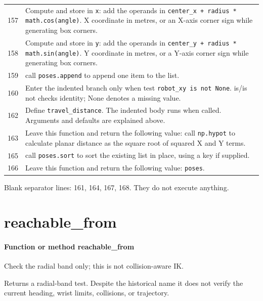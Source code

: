 \documentclass[11pt,a4paper]{book}
\begin{document}
\begin{longtable}{r p{}}
157 & Compute and store in \texttt{x}: add the operands in \texttt{center\_x + radius * math.cos(angle)}. X coordinate in metres, or an X-axis corner sign while generating box corners. \\

158 & Compute and store in \texttt{y}: add the operands in \texttt{center\_y + radius * math.sin(angle)}. Y coordinate in metres, or a Y-axis corner sign while generating box corners. \\

159 & call \texttt{poses.append} to append one item to the list. \\

160 & Enter the indented branch only when test \texttt{robot\_xy is not None}. is/is not checks identity; None denotes a missing value. \\

162 & Define \texttt{travel\_distance}. The indented body runs when called. Arguments and defaults are explained above. \\

163 & Leave this function and return the following value: call \texttt{np.hypot} to calculate planar distance as the square root of squared X and Y terms. \\

165 & call \texttt{poses.sort} to sort the existing list in place, using a key if supplied. \\

166 & Leave this function and return the following value: \texttt{poses}. \\

\end{longtable}

Blank separator lines: 161, 164, 167, 168. They do not execute anything.

\section{reachable\_from}

\paragraph{Function or method reachable\_from}
Check the radial band only; this is not collision-aware IK.

Returns a radial-band test. Despite the historical name it does not verify the current heading, wrist limits, collisions, or trajectory.
\end{document}
